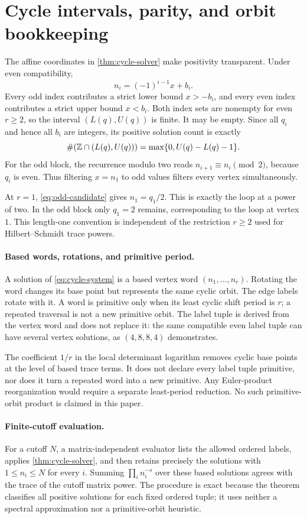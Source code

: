 \section{Cycle intervals, parity, and orbit bookkeeping}
\label{app:cycles}

The affine coordinates in \cref{thm:cycle-solver} make positivity
transparent.  Under even compatibility,
\[
  n_i=(-1)^{i-1}x+b_i.
\]
Every odd index contributes a strict lower bound $x>-b_i$, and every even
index contributes a strict upper bound $x<b_i$.  Both index sets are
nonempty for even $r\ge2$, so the interval $(L(q),U(q))$ is finite.  It may
be empty.  Since all $q_i$ and hence all $b_i$ are integers, its positive
solution count is exactly
\[
  \#(\mathbb Z\cap(L(q),U(q)))
  =\max\{0,U(q)-L(q)-1\}.
\]
For the odd block, the recurrence modulo two reads
$n_{i+1}\equiv n_i\pmod2$, because $q_i$ is even.  Thus filtering $x=n_1$
to odd values filters every vertex simultaneously.

At $r=1$, \cref{eq:odd-candidate} gives $n_1=q_1/2$.  This is exactly the
loop at a power of two.  In the odd block only $q_1=2$ remains, corresponding
to the loop at vertex $1$.  This length-one convention is independent of the
restriction $r\ge2$ used for Hilbert--Schmidt trace powers.

\paragraph{Based words, rotations, and primitive period.}
A solution of \cref{eq:cycle-system} is a based vertex word
$(n_1,\ldots,n_r)$.  Rotating the word changes its base point but represents
the same cyclic orbit.  The edge labels rotate with it.  A word is primitive
only when its least cyclic shift period is $r$; a repeated traversal is not a
new primitive orbit.  The label tuple is derived from the vertex word and
does not replace it: the same compatible even label tuple can have several
vertex solutions, as $(4,8,8,4)$ demonstrates.

The coefficient $1/r$ in the local determinant logarithm removes cyclic base
points at the level of based trace terms.  It does not declare every label
tuple primitive, nor does it turn a repeated word into a new primitive.
Any Euler-product reorganization would require a separate least-period
reduction.  No such primitive-orbit product is claimed in this paper.

\paragraph{Finite-cutoff evaluation.}
For a cutoff $N$, a matrix-independent evaluator lists the allowed ordered
labels, applies \cref{thm:cycle-solver}, and then retains precisely the
solutions with $1\le n_i\le N$ for every $i$.  Summing
$\prod_i n_i^{-s}$ over these based solutions agrees with the trace of the
cutoff matrix power.  The procedure is exact because the theorem classifies
all positive solutions for each fixed ordered tuple; it uses neither a
spectral approximation nor a primitive-orbit heuristic.
